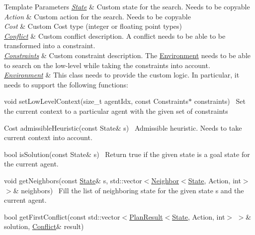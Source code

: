 \begin{DoxyTemplParams}{Template Parameters}
{\em \hyperlink{structlib_multi_robot_planning_1_1_state}{State}} & Custom state for the search. Needs to be copy\textquotesingle{}able \\
\hline
{\em Action} & Custom action for the search. Needs to be copy\textquotesingle{}able \\
\hline
{\em Cost} & Custom Cost type (integer or floating point types) \\
\hline
{\em \hyperlink{structlib_multi_robot_planning_1_1_conflict}{Conflict}} & Custom conflict description. A conflict needs to be able to be transformed into a constraint. \\
\hline
{\em \hyperlink{structlib_multi_robot_planning_1_1_constraints}{Constraints}} & Custom constraint description. The \hyperlink{classlib_multi_robot_planning_1_1_environment}{Environment} needs to be able to search on the low-\/level while taking the constraints into account. \\
\hline
{\em \hyperlink{classlib_multi_robot_planning_1_1_environment}{Environment}} & This class needs to provide the custom logic. In particular, it needs to support the following functions\+:
\begin{DoxyItemize}
\item {\ttfamily void set\+Low\+Level\+Context(size\+\_\+t agent\+Idx, const Constraints$\ast$ constraints)}~\newline
 Set the current context to a particular agent with the given set of constraints
\item {\ttfamily Cost admissible\+Heuristic(const State\& s)}~\newline
 Admissible heuristic. Needs to take current context into account.
\item {\ttfamily bool is\+Solution(const State\& s)}~\newline
 Return true if the given state is a goal state for the current agent.
\item {\ttfamily void get\+Neighbors(const \hyperlink{structlib_multi_robot_planning_1_1_state}{State}\& s, std\+::vector$<$\hyperlink{structlib_multi_robot_planning_1_1_neighbor}{Neighbor}$<$\hyperlink{structlib_multi_robot_planning_1_1_state}{State}, Action, int$>$ $>$\& neighbors)}~\newline
 Fill the list of neighboring state for the given state s and the current agent.
\item {\ttfamily bool get\+First\+Conflict(const std\+::vector$<$\hyperlink{structlib_multi_robot_planning_1_1_plan_result}{Plan\+Result}$<$\hyperlink{structlib_multi_robot_planning_1_1_state}{State}, Action, int$>$ $>$\& solution, \hyperlink{structlib_multi_robot_planning_1_1_conflict}{Conflict}\& result)}~\newline

\end{DoxyItemize}
\end{DoxyTemplParams}
